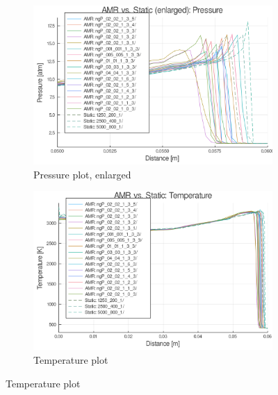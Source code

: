 \begin{figure} \ContinuedFloat

    \centering
    \begin{subfigure}[]{\textwidth}
        \centering
        \includegraphics[width=\textwidth]{./figs/amrfigs/amrcompare_all/pe.png}
        \caption{Pressure plot, enlarged}
    \end{subfigure}

    \centering
    \begin{subfigure}[]{\textwidth}
        \centering
        \includegraphics[width=\textwidth]{./figs/amrfigs/amrcompare_all/t.png}
        \caption{Temperature plot}
    \end{subfigure}

\end{figure}
